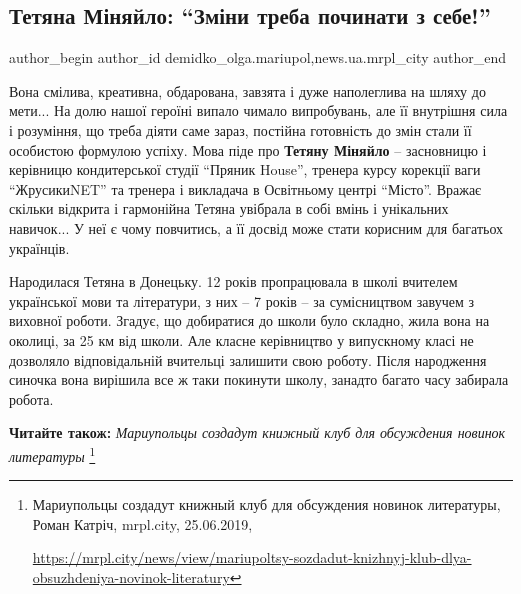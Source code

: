  
 
 
 
 
 
\subsection{Тетяна Міняйло: \enquote{Зміни треба починати з себе!}}
\label{sec:25_06_2019.stz.news.ua.mrpl_city.1.tetjana_minjajlo_zminy_treba_pochynaty_z_sebe}
 
\ifcmt
 author_begin
   author_id demidko_olga.mariupol,news.ua.mrpl_city
 author_end
\fi


Вона смілива, креативна, обдарована, завзята і дуже наполеглива на шляху до
мети... На долю нашої героїні випало чимало випробувань, але її внутрішня сила
і розуміння, що треба діяти саме зараз, постійна готовність до змін стали її
особистою формулою успіху. Мова піде про \textbf{Тетяну Міняйло} – засновницю і
керівницю кондитерської студії \enquote{Пряник House}, тренера курсу корекції ваги
\enquote{ЖрусикиNET} та тренера і викладача в Освітньому центрі \enquote{Місто}. Вражає скільки
відкрита і гармонійна Тетяна увібрала в собі вмінь і унікальних навичок... У неї
є чому повчитись, а її досвід може стати корисним для багатьох українців.

Народилася Тетяна в Донецьку. 12 років пропрацювала в школі вчителем
української мови та літератури, з них – 7 років – за сумісництвом завучем з
виховної роботи. Згадує, що добиратися до школи було складно, жила вона на
околиці, за 25 км від школи. Але класне керівництво у випускному класі не
дозволяло відповідальній вчительці залишити свою роботу. Після народження
синочка вона вирішила все ж таки покинути школу, занадто багато часу забирала
робота.

\textbf{Читайте також:} \emph{Мариупольцы создадут книжный клуб для обсуждения новинок литературы}%
\footnote{Мариупольцы создадут книжный клуб для обсуждения новинок литературы, Роман Катріч, mrpl.city, 25.06.2019, \par%
\url{https://mrpl.city/news/view/mariupoltsy-sozdadut-knizhnyj-klub-dlya-obsuzhdeniya-novinok-literatury}
}

